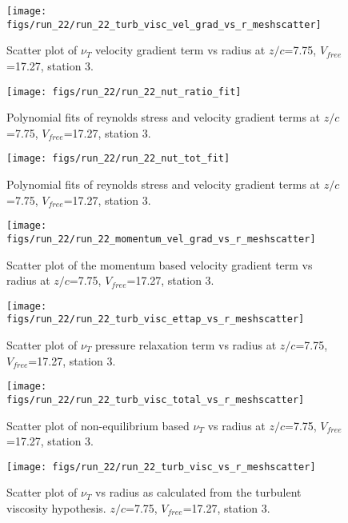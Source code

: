 \begin{figure}[H]
\centering
\texttt{[image: figs/run\_22/run\_22\_turb\_visc\_vel\_grad\_vs\_r\_meshscatter]}
\caption{Scatter plot of $\nu_T$ velocity gradient term vs radius at $z/c$=7.75, $V_{free}$=17.27, station 3.}
\end{figure}


\begin{figure}[H]
\centering
\texttt{[image: figs/run\_22/run\_22\_nut\_ratio\_fit]}
\caption{Polynomial fits of reynolds stress and velocity gradient terms at $z/c$=7.75, $V_{free}$=17.27, station 3.}
\end{figure}


\begin{figure}[H]
\centering
\texttt{[image: figs/run\_22/run\_22\_nut\_tot\_fit]}
\caption{Polynomial fits of reynolds stress and velocity gradient terms at $z/c$=7.75, $V_{free}$=17.27, station 3.}
\end{figure}


\begin{figure}[H]
\centering
\texttt{[image: figs/run\_22/run\_22\_momentum\_vel\_grad\_vs\_r\_meshscatter]}
\caption{Scatter plot of the momentum based velocity gradient term vs radius at $z/c$=7.75, $V_{free}$=17.27, station 3.}
\end{figure}


\begin{figure}[H]
\centering
\texttt{[image: figs/run\_22/run\_22\_turb\_visc\_ettap\_vs\_r\_meshscatter]}
\caption{Scatter plot of $\nu_T$ pressure relaxation term vs radius at $z/c$=7.75, $V_{free}$=17.27, station 3.}
\end{figure}


\begin{figure}[H]
\centering
\texttt{[image: figs/run\_22/run\_22\_turb\_visc\_total\_vs\_r\_meshscatter]}
\caption{Scatter plot of non-equilibrium based $\nu_T$ vs radius at $z/c$=7.75, $V_{free}$=17.27, station 3.}
\end{figure}


\begin{figure}[H]
\centering
\texttt{[image: figs/run\_22/run\_22\_turb\_visc\_vs\_r\_meshscatter]}
\caption{Scatter plot of $\nu_T$ vs radius as calculated from the turbulent viscosity hypothesis. $z/c$=7.75, $V_{free}$=17.27, station 3.}
\end{figure}


